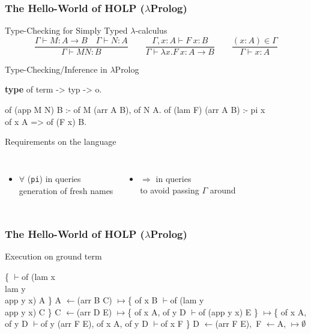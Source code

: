 \documentclass{beamer}
\newcommand{\vvdash}{$\vdash$}
\newcommand{\mmapsto}{$\mapsto$}
\newcommand{\lleftarrow}{$\leftarrow$}
\newcommand{\eemptyset}{$\emptyset$}
\begin{document}
\begin{frame}[fragile]
 \frametitle{The Hello-World of HOLP ($\lambda$Prolog)}
 {\small
 \begin{block}{Type-Checking for Simply Typed $\lambda$-calculus}
 $$\frac{\Gamma \vdash M : A \to  B \quad \Gamma \vdash N : A}{\Gamma \vdash M N : B} \quad \quad \frac{\Gamma, x : A \vdash F~x : B}{\Gamma \vdash \lambda x. F~x : A \to B} \quad \quad \frac{(x:A) \in \Gamma}{\Gamma \vdash x : A}$$
 \end{block}}

 \begin{block}{Type-Checking/Inference in $\lambda$Prolog}
  {\small
  \begin{semiverbatim}
\textbf{type} of term -> typ -> o.

of (app M N) B :- of M (arr A B), of N A.
of (lam F) (arr A B) :-
  pi x\\ of x A => of (F x) B.
  \end{semiverbatim}}
 \end{block}

 \begin{block}{Requirements on the language}
  \begin{columns}
   \begin{itemize}
    \item $\forall$ (\texttt{pi}) in queries\\
      \alert{generation of fresh names}
   \end{itemize}
   \begin{itemize}
    \item $\Rightarrow$ in queries\\
      \alert{to avoid passing $\Gamma$ around}
   \end{itemize}
   \end{columns}
 \end{block}
\end{frame}

\begin{frame}[fragile]
 \frametitle{The Hello-World of HOLP ($\lambda$Prolog)}

 \begin{block}{{\small Execution on ground term}}
{\small
 \begin{semiverbatim}
   \{ \vvdash of (lam x \\ lam y \\ app y x) A \}
\alert{A \lleftarrow (arr B C)}
\mmapsto \{ of x B \vvdash of (lam y \\ app y x) C \}
\alert{C \lleftarrow (arr D E)}
\mmapsto \{ of x A, of y D \vvdash of (app y x) E \}
\mmapsto \{ of x A, of y D \vvdash of y (arr F E),
     of x A, of y D \vvdash of x F \}
\alert{D \lleftarrow (arr F E),\, F \lleftarrow A,}
\mmapsto \eemptyset
 \end{semiverbatim}
}
 \end{block}
\end{frame}
\end{document}
